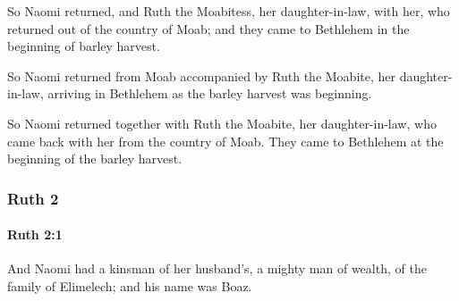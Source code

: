 			\begin{versebox}
					\item[BHS] 
					\item[LXX] 
					\item[ASV] So Naomi returned, and Ruth the Moabitess, her daughter-in-law, with her, who returned out of the country of Moab; and they came to Bethlehem in the beginning of barley harvest.
					\item[NIV] So Naomi returned from Moab accompanied by Ruth the Moabite, her daughter-in-law, arriving in Bethlehem as the barley harvest was beginning.
					\item[NRSV] So Naomi returned together with Ruth the Moabite, her daughter-in-law, who came back with her from the country of Moab. They came to Bethlehem at the beginning of the barley harvest.
			\end{versebox}
	\subsubsection{Ruth 2} %
		\label{RUTH-2}

		\paragraph{Ruth 2:1} %
			\label{RUTH-2-1}

			And Naomi had a kinsman of her husband’s, a mighty man of wealth, of the family of Elimelech; and his name was Boaz.

